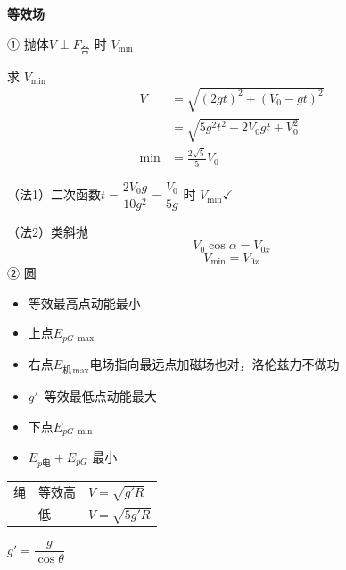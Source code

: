 \noindent \textbf{等效场}

\noindent ① 抛体\qquad $V\perp F_{\text{合}}$ 时 $V_{\min}$

\noindent 求 $V_{\min}$
\begin{align*}
V&=\sqrt{(2gt)^2+(V_0-gt)^2}\\
&=\sqrt{5g^2t^2-2V_0gt+V_0^2}\\
\min&=\frac{2\sqrt5}{5}V_0
\end{align*}

\noindent （法1）二次函数\qquad $t=\dfrac{2V_0g}{10g^2}=\dfrac{V_0}{5g}$ 时 $V_{\min}$\quad $\checkmark$

\noindent （法2）类斜抛
\[ V_0\cos\alpha=V_{0x} \]
\[ V_{\min}=V_{0x} \]
\noindent ② 圆
\begin{itemize}
\item 等效最高点\quad 动能最小
\item 上点\quad $E_{pG\,\max}$
\item 右点\quad $E_{\text{机}\,\max}$\quad 电场指向最远点\qquad 加磁场也对，洛伦兹力不做功
\item $g'$\ 等效最低点\quad 动能最大
\item 下点\quad $E_{pG\,\min}$
\item $E_{p\text{电}}+E_{pG}$ 最小
\end{itemize}

\medskip
\noindent
\begin{tabular}{@{}lll@{}}
绳 & 等效高 & $V=\sqrt{g'R}$ \\
 & 低 & $V=\sqrt{5g'R}$
\end{tabular}
\qquad $g'=\dfrac{g}{\cos\theta}$

